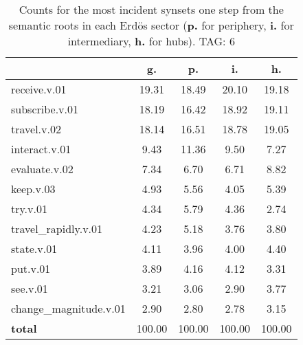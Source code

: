 \begin{table}[h!]
\begin{center}
\begin{tabular}{| l | c | c | c | c |}\hline
 & g. & p. & i. & h. \\\hline
receive.v.01 & 19.31  & 18.49  & 20.10  & 19.18 \\\hline
subscribe.v.01 & 18.19  & 16.42  & 18.92  & 19.11 \\\hline
travel.v.02 & 18.14  & 16.51  & 18.78  & 19.05 \\\hline
interact.v.01 & 9.43  & 11.36  & 9.50  & 7.27 \\\hline
evaluate.v.02 & 7.34  & 6.70  & 6.71  & 8.82 \\\hline
keep.v.03 & 4.93  & 5.56  & 4.05  & 5.39 \\\hline
try.v.01 & 4.34  & 5.79  & 4.36  & 2.74 \\\hline
travel\_rapidly.v.01 & 4.23  & 5.18  & 3.76  & 3.80 \\\hline
state.v.01 & 4.11  & 3.96  & 4.00  & 4.40 \\\hline
put.v.01 & 3.89  & 4.16  & 4.12  & 3.31 \\\hline
see.v.01 & 3.21  & 3.06  & 2.90  & 3.77 \\\hline
change\_magnitude.v.01 & 2.90  & 2.80  & 2.78  & 3.15 \\\hline
{{\bf total}} & 100.00  & 100.00  & 100.00  & 100.00 \\\hline
\end{tabular}
\caption{Counts for the most incident synsets one step from the semantic roots in each Erd\"os sector ({\bf p.} for periphery, {\bf i.} for intermediary, {\bf h.} for hubs). TAG: 6}
\end{center}
\end{table}